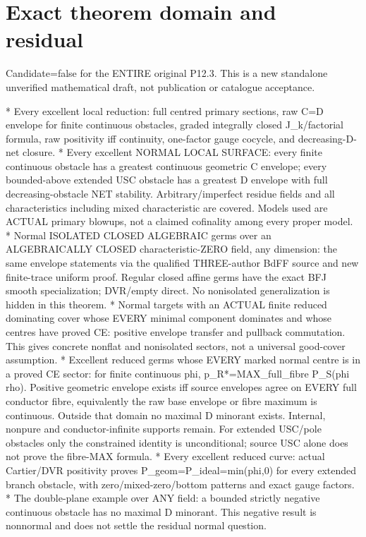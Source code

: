 \documentclass[11pt]{article}
\begin{document}
\section*{Exact theorem domain and residual}

Candidate=false for the ENTIRE original P12.3. This is a new standalone unverified mathematical draft, not publication or catalogue acceptance.

* Every excellent local reduction: full centred primary sections, raw C=D envelope for finite continuous obstacles, graded integrally closed J\_k/factorial formula, raw positivity iff continuity, one-factor gauge cocycle, and decreasing-D-net closure.
* Every excellent NORMAL LOCAL SURFACE: every finite continuous obstacle has a greatest continuous geometric C envelope; every bounded-above extended USC obstacle has a greatest D envelope with full decreasing-obstacle NET stability. Arbitrary/imperfect residue fields and all characteristics including mixed characteristic are covered. Models used are ACTUAL primary blowups, not a claimed cofinality among every proper model.
* Normal ISOLATED CLOSED ALGEBRAIC germs over an ALGEBRAICALLY CLOSED characteristic-ZERO field, any dimension: the same envelope statements via the qualified THREE-author BdFF source and new finite-trace uniform proof. Regular closed affine germs have the exact BFJ smooth specialization; DVR/empty direct. No nonisolated generalization is hidden in this theorem.
* Normal targets with an ACTUAL finite reduced dominating cover whose EVERY minimal component dominates and whose centres have proved CE: positive envelope transfer and pullback commutation. This gives concrete nonflat and nonisolated sectors, not a universal good-cover assumption.
* Excellent reduced germs whose EVERY marked normal centre is in a proved CE sector: for finite continuous phi, p\_R*=MAX\_full\_fibre P\_S(phi rho). Positive geometric envelope exists iff source envelopes agree on EVERY full conductor fibre, equivalently the raw base envelope or fibre maximum is continuous. Outside that domain no maximal D minorant exists. Internal, nonpure and conductor-infinite supports remain. For extended USC/pole obstacles only the constrained identity is unconditional; source USC alone does not prove the fibre-MAX formula.
* Every excellent reduced curve: actual Cartier/DVR positivity proves P\_geom=P\_ideal=min(phi,0) for every extended branch obstacle, with zero/mixed-zero/bottom patterns and exact gauge factors.
* The double-plane example over ANY field: a bounded strictly negative continuous obstacle has no maximal D minorant. This negative result is nonnormal and does not settle the residual normal question.
\end{document}
